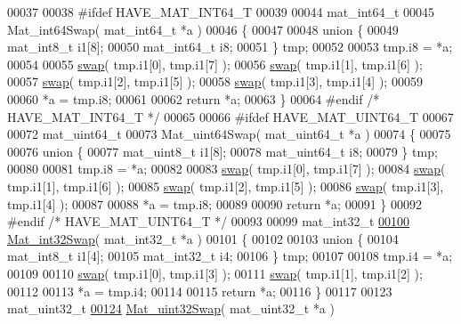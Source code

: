 \begin{DoxyCode}
00037 
00038 \textcolor{preprocessor}{#ifdef HAVE\_MAT\_INT64\_T}
00039 
00044 mat\_int64\_t
00045 Mat\_int64Swap( mat\_int64\_t *a )
00046 \{
00047 
00048     \textcolor{keyword}{union }\{
00049         mat\_int8\_t    i1[8];
00050         mat\_int64\_t   i8;
00051     \} tmp;
00052 
00053     tmp.i8 = *a;
00054 
00055     \hyperlink{endian_8c_a3ca5ecd34b04d6a243c054ac3a57f68d}{swap}( tmp.i1[0], tmp.i1[7] );
00056     \hyperlink{endian_8c_a3ca5ecd34b04d6a243c054ac3a57f68d}{swap}( tmp.i1[1], tmp.i1[6] );
00057     \hyperlink{endian_8c_a3ca5ecd34b04d6a243c054ac3a57f68d}{swap}( tmp.i1[2], tmp.i1[5] );
00058     \hyperlink{endian_8c_a3ca5ecd34b04d6a243c054ac3a57f68d}{swap}( tmp.i1[3], tmp.i1[4] );
00059 
00060     *a = tmp.i8;
00061 
00062     \textcolor{keywordflow}{return} *a;
00063 \}
00064 \textcolor{preprocessor}{#endif }\textcolor{comment}{/* HAVE\_MAT\_INT64\_T */}\textcolor{preprocessor}{}
00065 
00066 \textcolor{preprocessor}{#ifdef HAVE\_MAT\_UINT64\_T}
00067 
00072 mat\_uint64\_t
00073 Mat\_uint64Swap( mat\_uint64\_t *a )
00074 \{
00075 
00076     \textcolor{keyword}{union }\{
00077         mat\_uint8\_t    i1[8];
00078         mat\_uint64\_t   i8;
00079     \} tmp;
00080 
00081     tmp.i8 = *a;
00082 
00083     \hyperlink{endian_8c_a3ca5ecd34b04d6a243c054ac3a57f68d}{swap}( tmp.i1[0], tmp.i1[7] );
00084     \hyperlink{endian_8c_a3ca5ecd34b04d6a243c054ac3a57f68d}{swap}( tmp.i1[1], tmp.i1[6] );
00085     \hyperlink{endian_8c_a3ca5ecd34b04d6a243c054ac3a57f68d}{swap}( tmp.i1[2], tmp.i1[5] );
00086     \hyperlink{endian_8c_a3ca5ecd34b04d6a243c054ac3a57f68d}{swap}( tmp.i1[3], tmp.i1[4] );
00087 
00088     *a = tmp.i8;
00089 
00090     \textcolor{keywordflow}{return} *a;
00091 \}
00092 \textcolor{preprocessor}{#endif }\textcolor{comment}{/* HAVE\_MAT\_UINT64\_T */}\textcolor{preprocessor}{}
00093 
00099 mat\_int32\_t
\hyperlink{endian_8c_a2e0153996243f0a34df9a5286087cfa3}{00100} \hyperlink{endian_8c_a2e0153996243f0a34df9a5286087cfa3}{Mat\_int32Swap}( mat\_int32\_t *a )
00101 \{
00102 
00103     \textcolor{keyword}{union }\{
00104         mat\_int8\_t    i1[4];
00105         mat\_int32\_t   i4;
00106     \} tmp;
00107 
00108     tmp.i4 = *a;
00109 
00110     \hyperlink{endian_8c_a3ca5ecd34b04d6a243c054ac3a57f68d}{swap}( tmp.i1[0], tmp.i1[3] );
00111     \hyperlink{endian_8c_a3ca5ecd34b04d6a243c054ac3a57f68d}{swap}( tmp.i1[1], tmp.i1[2] );
00112 
00113     *a = tmp.i4;
00114 
00115     \textcolor{keywordflow}{return} *a;
00116 \}
00117 
00123 mat\_uint32\_t
\hyperlink{endian_8c_a8cb0d0750e2eaf9840d95db531934f4f}{00124} \hyperlink{endian_8c_a8cb0d0750e2eaf9840d95db531934f4f}{Mat\_uint32Swap}( mat\_uint32\_t *a )

\end{DoxyCode}
